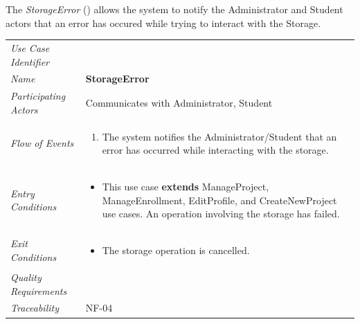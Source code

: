 \documentclass[12pt,letterpaper]{article}
\begin{document}
\vspace{1em}
The {\it StorageError} () allows the system to notify the Administrator and Student actors that an error has occured while trying to interact with the Storage.

\begin{center}
	\begin{tabu} to 
		\toprule
		Use Case Identifier &  \\
		Name & {\bf StorageError} \\
		Participating Actors & Communicates with Administrator, Student \\
		Flow of Events & 
		\begin{minipage}[t]{\linewidth}
		    \begin{enumerate}
			    \item The system notifies the Administrator/Student that an error has occurred while interacting with the storage.
			\end{enumerate}
		\end{minipage} \\

		Entry Conditions &
		\begin{minipage}[t]{\linewidth}
			\begin{itemize}
			    \item This use case \textbf{extends} ManageProject, ManageEnrollment, EditProfile, and CreateNewProject use cases. An operation involving the storage has failed.
	        \end{itemize}
		\end{minipage} \\

		Exit Conditions &
		\begin{minipage}[t]{\linewidth}
			\begin{itemize}
			    \item The storage operation is cancelled.
	        \end{itemize}
		\end{minipage} \\

		Quality Requirements & \\

		Traceability & NF-04 \\
		\toprule
	\end{tabu}
\end{center}

\newpage{}
\end{document}
